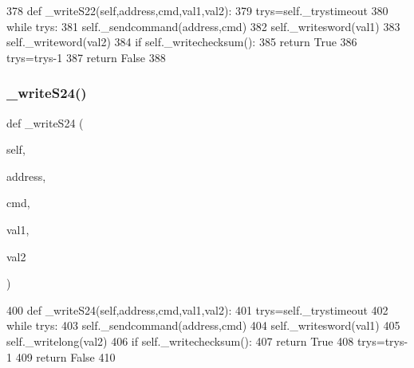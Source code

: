 \begin{DoxyCode}
378     \textcolor{keyword}{def }\_writeS22(self,address,cmd,val1,val2):
379         trys=self.\_trystimeout
380         \textcolor{keywordflow}{while} trys:
381             self.\_sendcommand(address,cmd)
382             self.\_writesword(val1)
383             self.\_writeword(val2)
384             \textcolor{keywordflow}{if} self.\_writechecksum():
385                 \textcolor{keywordflow}{return} \textcolor{keyword}{True}
386             trys=trys-1
387         \textcolor{keywordflow}{return} \textcolor{keyword}{False}
388 
\end{DoxyCode}
\mbox{\label{classtoxic__hardware_1_1roboclaw__3_1_1Roboclaw_a2acfdb332e8c1ae4d0cca985f2d690bf}} 
\subsubsection{\texorpdfstring{\+\_\+write\+S24()}{\_writeS24()}}
{\footnotesize\ttfamily def \+\_\+write\+S24 (\begin{DoxyParamCaption}\item[{}]{self,  }\item[{}]{address,  }\item[{}]{cmd,  }\item[{}]{val1,  }\item[{}]{val2 }\end{DoxyParamCaption})\hspace{0.3cm}{\ttfamily [private]}}


\begin{DoxyCode}
400     \textcolor{keyword}{def }\_writeS24(self,address,cmd,val1,val2):
401         trys=self.\_trystimeout
402         \textcolor{keywordflow}{while} trys:
403             self.\_sendcommand(address,cmd)
404             self.\_writesword(val1)
405             self.\_writelong(val2)
406             \textcolor{keywordflow}{if} self.\_writechecksum():
407                 \textcolor{keywordflow}{return} \textcolor{keyword}{True}
408             trys=trys-1
409         \textcolor{keywordflow}{return} \textcolor{keyword}{False}
410 
\end{DoxyCode}
\mbox{\label{classtoxic__hardware_1_1roboclaw__3_1_1Roboclaw_ab9a1f183de43e1f3bc9e6193a3a507b6}} 
